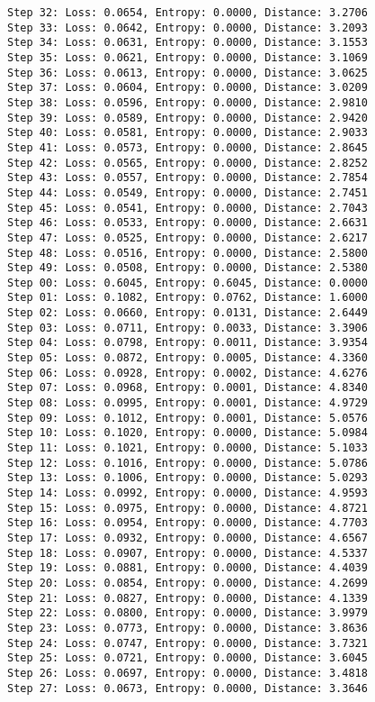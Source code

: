 \documentclass[11pt]{article}
\begin{document}
\begin{Verbatim}[commandchars=\\\{\}]
Step 32: Loss: 0.0654, Entropy: 0.0000, Distance: 3.2706
Step 33: Loss: 0.0642, Entropy: 0.0000, Distance: 3.2093
Step 34: Loss: 0.0631, Entropy: 0.0000, Distance: 3.1553
Step 35: Loss: 0.0621, Entropy: 0.0000, Distance: 3.1069
Step 36: Loss: 0.0613, Entropy: 0.0000, Distance: 3.0625
Step 37: Loss: 0.0604, Entropy: 0.0000, Distance: 3.0209
Step 38: Loss: 0.0596, Entropy: 0.0000, Distance: 2.9810
Step 39: Loss: 0.0589, Entropy: 0.0000, Distance: 2.9420
Step 40: Loss: 0.0581, Entropy: 0.0000, Distance: 2.9033
Step 41: Loss: 0.0573, Entropy: 0.0000, Distance: 2.8645
Step 42: Loss: 0.0565, Entropy: 0.0000, Distance: 2.8252
Step 43: Loss: 0.0557, Entropy: 0.0000, Distance: 2.7854
Step 44: Loss: 0.0549, Entropy: 0.0000, Distance: 2.7451
Step 45: Loss: 0.0541, Entropy: 0.0000, Distance: 2.7043
Step 46: Loss: 0.0533, Entropy: 0.0000, Distance: 2.6631
Step 47: Loss: 0.0525, Entropy: 0.0000, Distance: 2.6217
Step 48: Loss: 0.0516, Entropy: 0.0000, Distance: 2.5800
Step 49: Loss: 0.0508, Entropy: 0.0000, Distance: 2.5380
Step 00: Loss: 0.6045, Entropy: 0.6045, Distance: 0.0000
Step 01: Loss: 0.1082, Entropy: 0.0762, Distance: 1.6000
Step 02: Loss: 0.0660, Entropy: 0.0131, Distance: 2.6449
Step 03: Loss: 0.0711, Entropy: 0.0033, Distance: 3.3906
Step 04: Loss: 0.0798, Entropy: 0.0011, Distance: 3.9354
Step 05: Loss: 0.0872, Entropy: 0.0005, Distance: 4.3360
Step 06: Loss: 0.0928, Entropy: 0.0002, Distance: 4.6276
Step 07: Loss: 0.0968, Entropy: 0.0001, Distance: 4.8340
Step 08: Loss: 0.0995, Entropy: 0.0001, Distance: 4.9729
Step 09: Loss: 0.1012, Entropy: 0.0001, Distance: 5.0576
Step 10: Loss: 0.1020, Entropy: 0.0000, Distance: 5.0984
Step 11: Loss: 0.1021, Entropy: 0.0000, Distance: 5.1033
Step 12: Loss: 0.1016, Entropy: 0.0000, Distance: 5.0786
Step 13: Loss: 0.1006, Entropy: 0.0000, Distance: 5.0293
Step 14: Loss: 0.0992, Entropy: 0.0000, Distance: 4.9593
Step 15: Loss: 0.0975, Entropy: 0.0000, Distance: 4.8721
Step 16: Loss: 0.0954, Entropy: 0.0000, Distance: 4.7703
Step 17: Loss: 0.0932, Entropy: 0.0000, Distance: 4.6567
Step 18: Loss: 0.0907, Entropy: 0.0000, Distance: 4.5337
Step 19: Loss: 0.0881, Entropy: 0.0000, Distance: 4.4039
Step 20: Loss: 0.0854, Entropy: 0.0000, Distance: 4.2699
Step 21: Loss: 0.0827, Entropy: 0.0000, Distance: 4.1339
Step 22: Loss: 0.0800, Entropy: 0.0000, Distance: 3.9979
Step 23: Loss: 0.0773, Entropy: 0.0000, Distance: 3.8636
Step 24: Loss: 0.0747, Entropy: 0.0000, Distance: 3.7321
Step 25: Loss: 0.0721, Entropy: 0.0000, Distance: 3.6045
Step 26: Loss: 0.0697, Entropy: 0.0000, Distance: 3.4818
Step 27: Loss: 0.0673, Entropy: 0.0000, Distance: 3.3646

\end{Verbatim}
\end{document}
